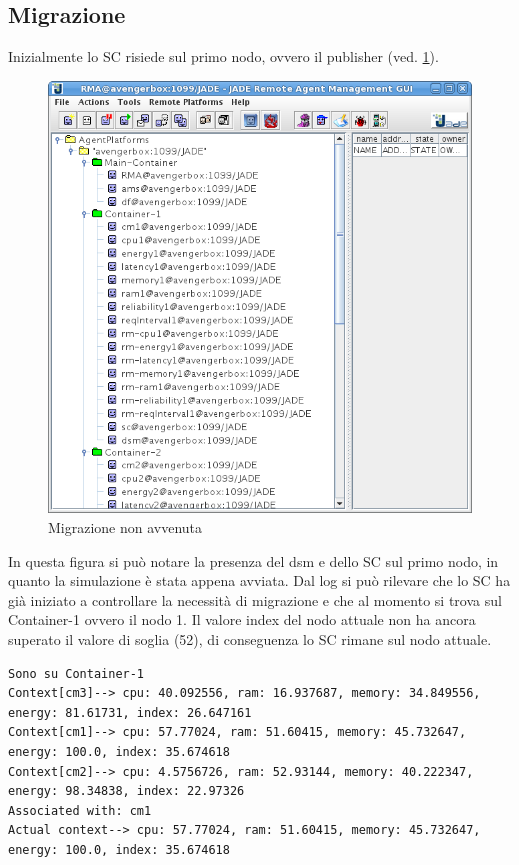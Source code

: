 \subsection{Migrazione}
Inizialmente lo SC risiede sul primo nodo, ovvero il publisher (ved. \ref{fig:primo}).
\begin{figure}[H]
\begin{center}
\includegraphics[scale=0.5]{etc/primo.png}
\caption{Migrazione non avvenuta}
\label{fig:primo}
\end{center}
\end{figure}
In questa figura si può notare la presenza del dsm e dello SC sul primo nodo, in quanto la simulazione è stata appena avviata. Dal log si può rilevare che lo SC ha già iniziato a controllare la necessità di migrazione e che al momento si trova sul Container-1 ovvero il nodo 1. Il valore index del nodo attuale non ha ancora superato il valore di soglia (52), di conseguenza lo SC rimane sul nodo attuale.
\begin{lstlisting}
Sono su Container-1
Context[cm3]--> cpu: 40.092556, ram: 16.937687, memory: 34.849556, energy: 81.61731, index: 26.647161
Context[cm1]--> cpu: 57.77024, ram: 51.60415, memory: 45.732647, energy: 100.0, index: 35.674618
Context[cm2]--> cpu: 4.5756726, ram: 52.93144, memory: 40.222347, energy: 98.34838, index: 22.97326
Associated with: cm1
Actual context--> cpu: 57.77024, ram: 51.60415, memory: 45.732647, energy: 100.0, index: 35.674618
\end{lstlisting}
